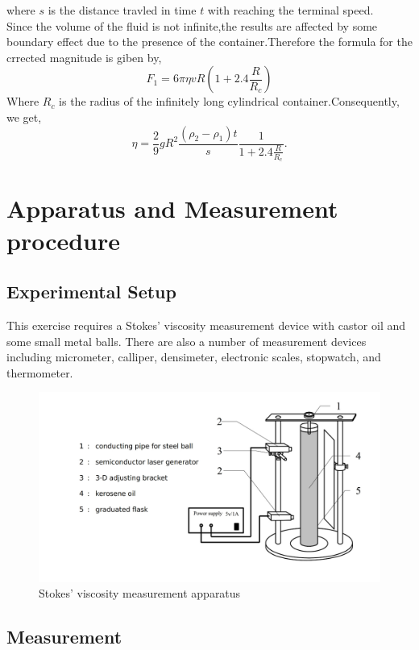 \documentclass[12pt]{article}
\begin{document}
        where $s$ is the distance travled in time $t$ with reaching the terminal speed.\\
        Since the volume of the fluid is not infinite,the results are affected by some boundary effect due to the presence of the container.Therefore the formula for the crrected magnitude is giben by,
        $$F_1=6\pi\eta vR(1+2.4\frac{R}{R_c})$$
        Where $R_c$ is the radius of the infinitely long cylindrical container.Consequently, we get,
        \begin{equation} \label{eta2}
                \eta=\frac{2}{9}gR^2\frac{(\rho_2-\rho_1)t}{s}\frac{1}{1+2.4\frac{R}{R_c}}.
        \end{equation}
    \section{Apparatus and Measurement procedure}
    \subsection{Experimental Setup}
    This exercise requires a Stokes' viscosity measurement device  with castor oil and some small metal balls. There are also a number of measurement devices including micrometer, calliper, densimeter, electronic scales, stopwatch, and thermometer.
    \begin{figure}[htbp]
        \centering
        \includegraphics[width=0.8\linewidth]{1.png}
        \caption{Stokes’ viscosity measurement apparatus}
        \label{apparatus}
    \end{figure}
    \subsection{Measurement}
\end{document}
